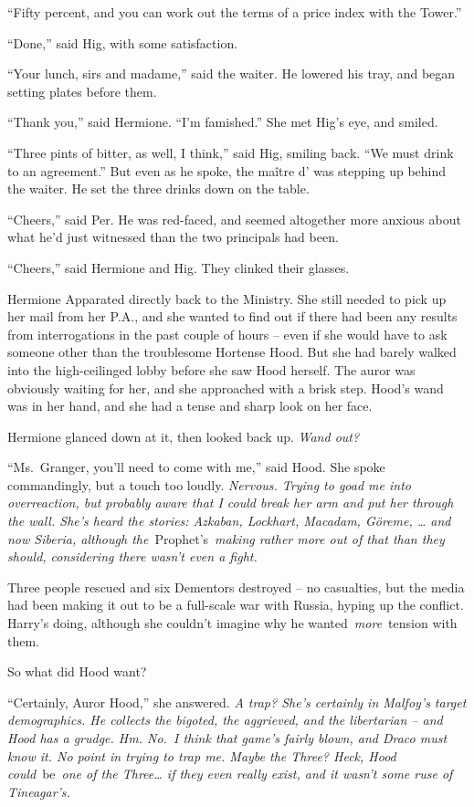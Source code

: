 ``Fifty percent, and you can work out the terms of a price index with
the Tower.''

``Done,'' said Hig, with some satisfaction.

``Your lunch, sirs and madame,'' said the waiter. He lowered his tray,
and began setting plates before them.

``Thank you,'' said Hermione. ``I'm famished.'' She met Hig's eye, and
smiled.

``Three pints of bitter, as well, I think,'' said Hig, smiling back.
``We must drink to an agreement.'' But even as he spoke, the maître d'
was stepping up behind the waiter. He set the three drinks down on the
table.

``Cheers,'' said Per. He was red-faced, and seemed altogether more
anxious about what he'd just witnessed than the two principals had been.

``Cheers,'' said Hermione and Hig. They clinked their glasses.

\mybreak

Hermione Apparated directly back to the Ministry. She still needed to
pick up her mail from her P.A., and she wanted to find out if there had
been any results from interrogations in the past couple of hours -- even
if she would have to ask someone other than the troublesome Hortense
Hood. But she had barely walked into the high-ceilinged lobby before she
saw Hood herself. The auror was obviously waiting for her, and she
approached with a brisk step. Hood's wand was in her hand, and she had a
tense and sharp look on her face.

Hermione glanced down at it, then looked back up. \emph{Wand out?}

``Ms.~Granger, you'll need to come with me,'' said Hood. She spoke
commandingly, but a touch too loudly. \emph{Nervous. Trying to goad me
into overreaction, but probably aware that I could break her arm and put
her through the wall. She's heard the stories: Azkaban, Lockhart,
Macadam, Göreme, \ldots{} and now Siberia, although
the}~Prophet's~\emph{making rather more out of that than they should,
considering there wasn't even a fight.}

Three people rescued and six Dementors destroyed -- no casualties, but
the media had been making it out to be a full-scale war with Russia,
hyping up the conflict. Harry's doing, although she couldn't imagine why
he wanted~\emph{more}~tension with them.

So what did Hood want?

``Certainly, Auror Hood,'' she answered. \emph{A trap? She's certainly
in Malfoy's target demographics. He collects the bigoted, the aggrieved,
and the libertarian -- and Hood has a grudge. Hm. No.~I think that
game's fairly blown, and Draco must know it. No point in trying to trap
me. Maybe the Three? Heck, Hood could}~be~\emph{one of the Three\ldots{}
if they even really exist, and it wasn't some ruse of Tineagar's.}

